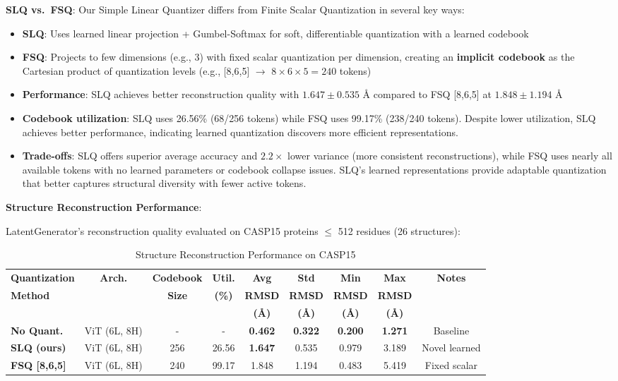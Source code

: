 \documentclass[11pt,a4paper]{article}
\begin{document}
\textbf{SLQ vs.~FSQ}: Our Simple Linear Quantizer differs from Finite Scalar Quantization \cite{mentzer2023} in several key ways:
\begin{itemize}
\item \textbf{SLQ}: Uses learned linear projection + Gumbel-Softmax for soft, differentiable quantization with a learned codebook
\item \textbf{FSQ}: Projects to few dimensions (e.g., 3) with fixed scalar quantization per dimension, creating an \textbf{implicit codebook} as the Cartesian product of quantization levels (e.g., [8,6,5] $\rightarrow$ $8 \times 6 \times 5 = 240$ tokens)
\item \textbf{Performance}: SLQ achieves better reconstruction quality with $1.647 \pm 0.535$ Å compared to FSQ [8,6,5] at $1.848 \pm 1.194$ Å
\item \textbf{Codebook utilization}: SLQ uses 26.56\% (68/256 tokens) while FSQ uses 99.17\% (238/240 tokens). Despite lower utilization, SLQ achieves better performance, indicating learned quantization discovers more efficient representations.
\item \textbf{Trade-offs}: SLQ offers superior average accuracy and $2.2\times$ lower variance (more consistent reconstructions), while FSQ uses nearly all available tokens with no learned parameters or codebook collapse issues. SLQ's learned representations provide adaptable quantization that better captures structural diversity with fewer active tokens.
\end{itemize}

\textbf{Structure Reconstruction Performance}:

LatentGenerator's reconstruction quality evaluated on CASP15 proteins $\leq$ 512 residues (26 structures):

\begin{table}[h]
\centering
\small
\caption{Structure Reconstruction Performance on CASP15}
\begin{tabular}{@{}lcccccccc@{}}
\toprule
\textbf{Quantization} & \textbf{Arch.} & \textbf{Codebook} & \textbf{Util.} & \textbf{Avg} & \textbf{Std} & \textbf{Min} & \textbf{Max} & \textbf{Notes} \\
\textbf{Method} & & \textbf{Size} & \textbf{(\%)} & \textbf{RMSD} & \textbf{RMSD} & \textbf{RMSD} & \textbf{RMSD} & \\
 & & & & \textbf{(Å)} & \textbf{(Å)} & \textbf{(Å)} & \textbf{(Å)} & \\
\midrule
\textbf{No Quant.} & ViT (6L, 8H) & - & - & \textbf{0.462} & \textbf{0.322} & \textbf{0.200} & \textbf{1.271} & Baseline \\
\textbf{SLQ (ours)} & ViT (6L, 8H) & 256 & 26.56 & \textbf{1.647} & 0.535 & 0.979 & 3.189 & Novel learned \\
\textbf{FSQ [8,6,5]} & ViT (6L, 8H) & 240 & 99.17 & 1.848 & 1.194 & 0.483 & 5.419 & Fixed scalar \\
\bottomrule
\end{tabular}
\label{tab:reconstruction}
\end{table}
\end{document}
